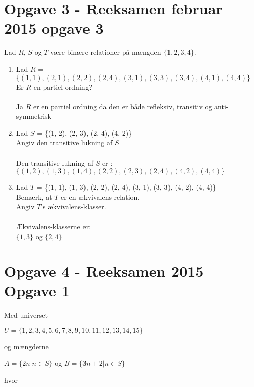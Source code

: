 \documentclass[20pt]{article}
\begin{document}
	\section*{Opgave 3 - Reeksamen februar 2015 opgave 3}
Lad \(R\), \(S\) og \(T\) være binære relationer på mængden \(\{1, 2, 3, 4\}\).
\begin{enumerate}[label=(\alph*)]
	\item 
	Lad \(R\) = \(\{(1, 1), (2, 1), (2, 2), (2, 4), (3, 1), (3, 3), (3, 4), (4, 1), (4, 4)\}\)\\
	Er \(R\) en partiel ordning?\\ \\
	Ja \(R\) er en partiel ordning da den er både refleksiv, transitiv og anti-symmetrisk\\
	\item
	Lad \(S\) = \{(1, 2), (2, 3), (2, 4), (4, 2)\}\\
	Angiv den transitive lukning af \(S\) \\ \\
	Den transitive lukning af \(S\) er : \\
	\(\{(1, 2), (1, 3), (1, 4), (2, 2), (2, 3), (2, 4), (4, 2), (4, 4)\}\)\\
	\item
	Lad \(T\) = \{(1, 1), (1, 3), (2, 2), (2, 4), (3, 1), (3, 3), (4, 2), (4, 4)\}\\
	Bemærk, at \(T\) er en ækvivalens-relation.\\
	Angiv \(T\)'s ækvivalens-klasser.\\ \\
	Ækvivalens-klasserne er:\\
	\(\{1, 3\}\) og \(\{2, 4\}\)\\
\end{enumerate}

\newpage	
\section*{Opgave 4 - Reeksamen 2015 Opgave 1} \par
	
\noindent Med universet

\hfil $U=\{1,2,3,4,5,6,7,8,9,10,11,12,13,14,15\}$ \par

\noindent og mængderne

\hfil $A = \{2n | n \in S\}  $ og $  B = \{3n + 2 | n \in S\}$ \par

\noindent hvor \par
\end{document}
